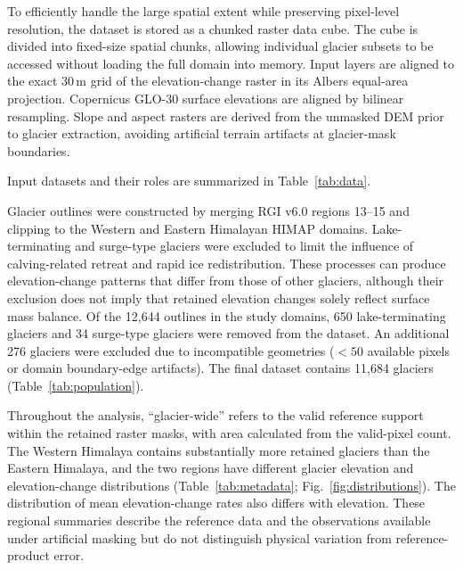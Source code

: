 \documentclass[tc,manuscript]{copernicus}
\begin{document}

\FloatBarrier

To efficiently handle the large spatial extent while preserving pixel-level resolution, the dataset is stored as a chunked raster data cube. The cube is divided into fixed-size spatial chunks, allowing individual glacier subsets to be accessed without loading the full domain into memory. Input layers are aligned to the exact 30\,m grid of the elevation-change raster in its Albers equal-area projection. Copernicus GLO-30 surface elevations \citep{opentopography2021} are aligned by bilinear resampling. Slope and aspect rasters are derived from the unmasked DEM prior to glacier extraction, avoiding artificial terrain artifacts at glacier-mask boundaries. 

Input datasets and their roles are summarized in Table~\ref{tab:data}.


\FloatBarrier

Glacier outlines were constructed by merging RGI v6.0 regions 13--15 \citep{rgi2017} and clipping to the Western and Eastern Himalayan HIMAP domains. Lake-terminating and surge-type glaciers were excluded to limit the influence of calving-related retreat and rapid ice redistribution. These processes can produce elevation-change patterns that differ from those of other glaciers, although their exclusion does not imply that retained elevation changes solely reflect surface mass balance. Of the 12,644 outlines in the study domains, 650 lake-terminating glaciers \citep{luo2026} and 34 surge-type glaciers \citep{guo2023} were removed from the dataset. An additional 276 glaciers were excluded due to incompatible geometries ($<50$ available pixels or domain boundary-edge artifacts). The final dataset contains 11,684 glaciers (Table~\ref{tab:population}).


\FloatBarrier

Throughout the analysis, ``glacier-wide'' refers to the valid reference support within the retained raster masks, with area calculated from the valid-pixel count. The Western Himalaya contains substantially more retained glaciers than the Eastern Himalaya, and the two regions have different glacier elevation and elevation-change distributions (Table~\ref{tab:metadata}; Fig.~\ref{fig:distributions}). The distribution of mean elevation-change rates also differs with elevation. These regional summaries describe the reference data and the observations available under artificial masking but do not distinguish physical variation from reference-product error.
\end{document}
